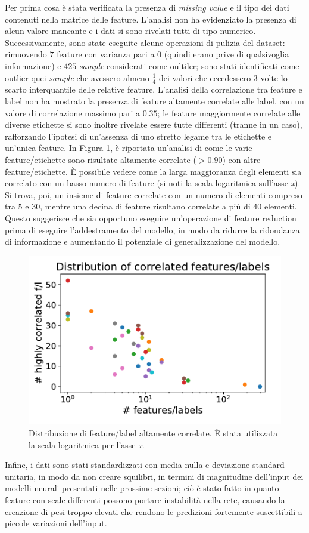Per prima cosa è stata verificata la presenza di \textit{missing value} e il tipo dei dati contenuti nella matrice delle feature. L'analisi non ha evidenziato la presenza di alcun valore mancante e i dati si sono rivelati tutti di tipo numerico.
Successivamente, sono state eseguite alcune operazioni di pulizia del dataset: rimuovendo $7$ feature con varianza pari a $0$ (quindi erano prive di qualsivoglia informazione) e $425$ \textit{sample} considerati come oultiler; sono stati identificati come outlier quei \textit{sample} che avessero almeno $\frac{1}{4}$ dei valori che eccedessero $3$ volte lo scarto interquantile delle relative feature.
L'analisi della correlazione tra feature e label non ha mostrato la presenza di feature altamente correlate alle label, con un valore di correlazione massimo pari a $0.35$; le feature maggiormente correlate alle diverse etichette si sono inoltre rivelate essere tutte differenti (tranne in un caso), rafforzando l'ipotesi di un'assenza di uno stretto legame tra le etichette e un'unica feature.
In Figura \ref{fig:distributionhighcorr}, è riportata un'analisi di come le varie feature/etichette sono risultate altamente correlate ($> 0.90$) con altre feature/etichette. È possibile vedere come la larga maggioranza degli elementi sia correlato con un basso numero di feature (si noti la scala logaritmica sull'asse \textit{x}).
Si trova, poi, un insieme di feature correlate con un numero di elementi compreso tra $5$ e $30$, mentre una decina di feature risultano correlate a più di 40 elementi. Questo suggerisce che sia opportuno eseguire un'operazione di feature reduction prima di eseguire l'addestramento del modello, in modo da ridurre la ridondanza di informazione e aumentando il potenziale di generalizzazione del modello.
\begin{figure}
	\centering
	\includegraphics[width=0.7\linewidth]{../images/pdf/distribution_high_corr}
	\caption{Distribuzione di feature/label altamente correlate. È stata utilizzata la scala logaritmica per l'asse \textit{x}.}
	\label{fig:distributionhighcorr}
\end{figure}
Infine, i dati sono stati  standardizzati con media nulla e deviazione standard unitaria, in modo da non creare squilibri, in termini di magnitudine dell'input dei modelli neurali presentati nelle prossime sezioni; ciò è stato fatto in quanto feature con scale differenti possono portare instabilità nella rete, causando la creazione di pesi troppo elevati che rendono le predizioni fortemente suscettibili a piccole variazioni dell'input.